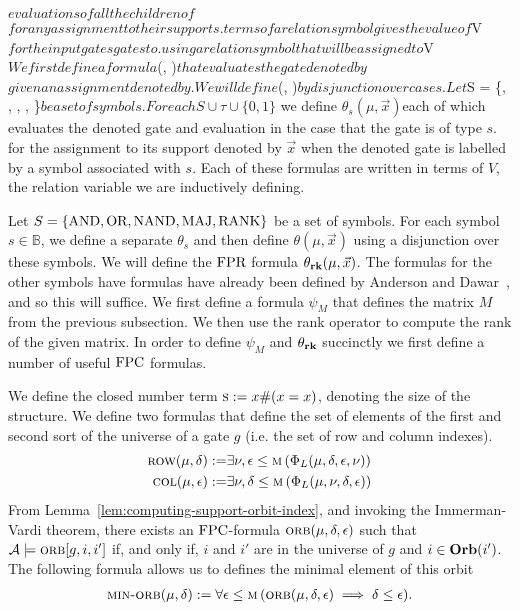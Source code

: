 \documentclass[../paper.tex]{subfiles}
\begin{document}
$evaluations of all the children of $\mu$ for any assignment to their supports.
terms of a relation symbol

gives the value of $V$ for the input gates gates to $\mu$. using a relation
symbol that will be assigned to $V$ We first define a formula $\theta(\mu,
)$ that evaluates the gate denoted by $\mu$ given an assignment denoted
by $$. We will define $\theta(\mu, )$ by disjunction over cases.
Let $S = \{\AND, \OR, \NAND, \MAJ, \RANK\}$ be a set of symbols. For each S \cup
\tau \cup \{0,1\}$ we define $\theta_s (\mu, \vec{x})$each of which evaluates
the denoted gate and evaluation in the case that the gate is of type $s$. for
the assignment to its support denoted by $\vec{x}$ when the denoted gate is
labelled by a symbol associated with $s$. Each of these formulas are written in
terms of $V$, the relation variable we are inductively defining.

Let $S = \{\text{\upshape AND}, \text{\upshape OR}, \text{\upshape NAND}, \text{\upshape MAJ}, \text{\upshape RANK}\}$ be a set of symbols. For each symbol
$s \in \mathbb{B}$, we define a separate $\theta_s$ and then define $\theta(\mu,
\vec{x})$ using a disjunction over these symbols. We will define the $\text{\upshape FPR}$
formula $\theta_{\text{\textbf{rk}}} (\mu, \vec{x})$. The formulas for the other symbols have
formulas have already been defined by Anderson and Dawar~\cite{AndersonD17}, and
so this will suffice. We first define a formula $\psi_M$ that defines the matrix
$M$ from the previous subsection. We then use the rank operator to compute the
rank of the given matrix. In order to define $\psi_M$ and $\theta_{\text{\textbf{rk}}}$
succinctly we first define a number of useful $\text{\upshape FPC}$ formulas.

We define the closed number term $\textsc{s} := x\# (x = x)$, denoting the size of
the structure. We define two formulas that define the set of elements of the
first and second sort of the universe of a gate $g$ (i.e. the set of row and
column indexes).
\begin{align*}
	\textsc{row} (\mu, \delta) :=   & \exists \nu, \epsilon \leq \textsc{m} \, (\Phi_L (\mu, \delta, \epsilon, \nu)) \\
	\textsc{col} (\mu, \epsilon) := & \exists \nu, \delta \leq \textsc{m} \, (\Phi_L (\mu, \nu, \delta , \epsilon))  
\end{align*}
From Lemma~\ref{lem:computing-support-orbit-index}, and invoking the
Immerman-Vardi theorem, there exists an $\text{\upshape FPC}$-formula $\textsc{orb}(\mu, \delta,
\epsilon)$ such that $\mathcal{A} \models \textsc{orb}[g,i, i']$ if, and only if,
$i$ and $i'$ are in the universe of $g$ and $i \in \text{\textbf{Orb}}(i')$. The following
formula allows us to defines the minimal element of this orbit
\begin{align*}
	\textsc{min-orb} (\mu, \delta) := \forall \epsilon \leq \textsc{m} \, (\textsc{orb} (\mu, \delta, \epsilon) \implies \delta \leq \epsilon). 
\end{align*}
\end{document}
